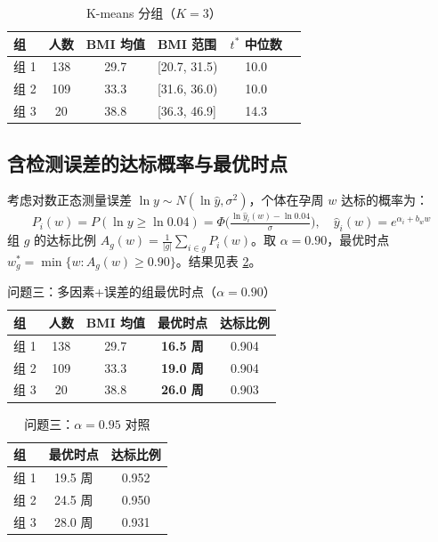 \documentclass[12pt,a4paper]{article}
\begin{document}
\begin{table}[H]
\centering
\caption{K-means 分组（$K=3$）}
\label{tab:kmeans}
\begin{tabular}{lcclcc}
\toprule
组 & 人数 & BMI 均值 & BMI 范围 & $t^*$ 中位数 \\
\midrule
组 1 & 138 & 29.7 & [20.7, 31.5) & 10.0 \\
组 2 & 109 & 33.3 & [31.6, 36.0) & 10.0 \\
组 3 & 20  & 38.8 & [36.3, 46.9] & 14.3 \\
\bottomrule
\end{tabular}
\end{table}

\subsection{含检测误差的达标概率与最优时点}
考虑对数正态测量误差 $\ln y\sim N(\ln\hat y,\sigma^2)$，个体在孕周 $w$ 达标的概率为：
\begin{equation}
P_i(w)=P(\ln y\geq\ln 0.04)=\Phi\!\Big(\tfrac{\ln \hat y_i(w)-\ln 0.04}{\sigma}\Big),\quad \hat y_i(w)=e^{\alpha_i+b_w w}
\end{equation}
组 $g$ 的达标比例 $A_g(w)=\frac{1}{|g|}\sum_{i\in g}P_i(w)$。取 $\alpha=0.90$，最优时点 $w^*_g=\min\{w:A_g(w)\geq0.90\}$。结果见表 \ref{tab:q3}。

\begin{table}[H]
\centering
\caption{问题三：多因素+误差的组最优时点（$\alpha=0.90$）}
\label{tab:q3}
\begin{tabular}{lcccc}
\toprule
组 & 人数 & BMI 均值 & 最优时点 & 达标比例 \\
\midrule
组 1 & 138 & 29.7 & \textbf{16.5 周} & 0.904 \\
组 2 & 109 & 33.3 & \textbf{19.0 周} & 0.904 \\
组 3 & 20  & 38.8 & \textbf{26.0 周} & 0.903 \\
\bottomrule
\end{tabular}
\end{table}

\begin{table}[H]
\centering
\caption{问题三：$\alpha=0.95$ 对照}
\label{tab:q3b}
\begin{tabular}{lcc}
\toprule
组 & 最优时点 & 达标比例 \\
\midrule
组 1 & 19.5 周 & 0.952 \\
组 2 & 24.5 周 & 0.950 \\
组 3 & 28.0 周 & 0.931 \\
\bottomrule
\end{tabular}
\end{table}
\end{document}
